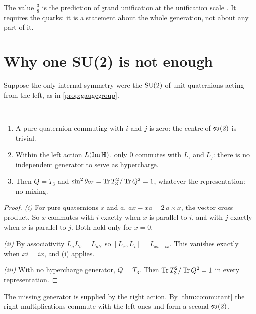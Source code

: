 The value $\frac38$ is the prediction of grand unification at the unification scale \cite{GeorgiGlashow1974}. It requires the quarks: it is a statement about the whole generation, not about any part of it.

\section{Why one SU(2) is not enough}

Suppose the only internal symmetry were the $\mathrm{SU}(2)$ of unit quaternions acting from the left, as in \cref{prop:gaugegroup}.

\begin{proposition}\label{prop:nohyper}\ver\
\begin{enumerate}[label=(\roman*)]
\item A pure quaternion commuting with $i$ and $j$ is zero: the centre of $\mathfrak{su}(2)$ is trivial.
\item Within the left action $L(\operatorname{Im}\mathbb{H})$, only $0$ commutes with $L_i$ and $L_j$: there is no independent generator to serve as hypercharge.
\item Then $Q=T_3$ and $\sin^2\theta_W=\operatorname{Tr} T_3^2/\operatorname{Tr} Q^2=1$, whatever the representation: no mixing.
\end{enumerate}
\end{proposition}
\begin{proof}
\emph{(i)} For pure quaternions $x$ and $a$, $ax-xa=2\,a\times x$, the vector cross product. So $x$ commutes with $i$ exactly when $x$ is parallel to $i$, and with $j$ exactly when $x$ is parallel to $j$. Both hold only for $x=0$.

\emph{(ii)} By associativity $L_aL_b=L_{ab}$, so $[L_x,L_i]=L_{xi-ix}$. This vanishes exactly when $xi=ix$, and (i) applies.

\emph{(iii)} With no hypercharge generator, $Q=T_3$. Then $\operatorname{Tr} T_3^2/\operatorname{Tr} Q^2=1$ in every representation.
\end{proof}


The missing generator is supplied by the right action. By \cref{thm:commutant} the right multiplications commute with the left ones and form a second $\mathfrak{su}(2)$.

